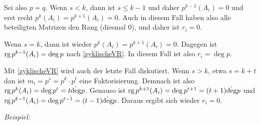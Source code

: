 \begin{mysatz}
        Sei also $p = q$. Wenn $s < k$, dann ist $s \leq k-1$ und daher $p^{k-1}(A_i) = 0$ und erst recht $p^k(A_i) = p^{k+1}(A_i) = 0$.
        Auch in diesem Fall haben also alle beteiligten Matrizen den Rang (diesmal $0$), und daher ist $r_i = 0$.

        Wenn $s = k$, dann ist wieder $p^k(A_i) = p^{k+1}(A_i) = 0$. Dagegen ist $\text{rg}\, p^{k-1}(A_i) = \deg p$ nach \ref{zyklischeVR}.
        In diesem Fall ist also $r_i = \deg p$.

        Mit \ref{zyklischeVR} wird auch der letzte Fall diskutiert. Wenn $s > k$, etwa $s = k+t$ dan ist $m_i = p^s = p^k \cdot p^t$ eine Faktorisierung.
        Demnach ist also $\text{rg}\, p^k(A_i) = \deg p^t = t \dot \deg p$.
        Genauso ist $\text{rg}\, p^{k+1}(A_i) = \deg p^{t+1} = (t+1)\dot \deg p$ und $\text{rg}\, p^{k-1}(A_i) = \deg p^{t-1} = (t-1)\dot \deg p$. Daraus ergibt sich wieder $r_i = 0$.
\end{mysatz}


\textit{Beispiel:}

